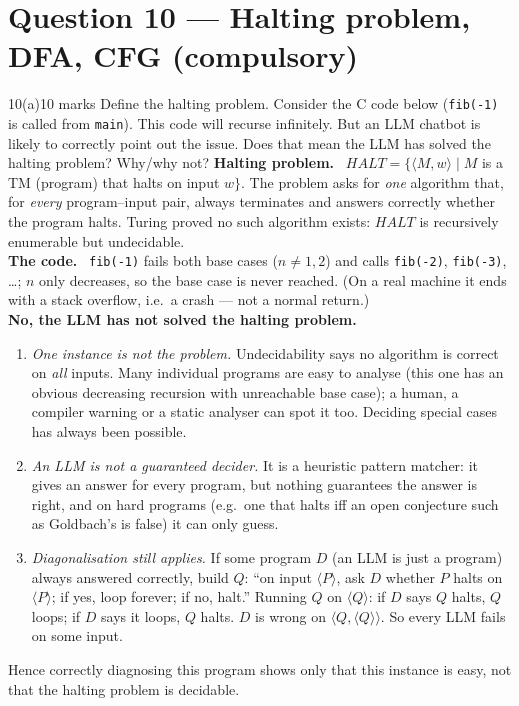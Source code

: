 \documentclass[10.5pt,a4paper]{article}
\newcommand{\ansh}[1]{\textbf{\color{exborder}#1}\ }
\begin{document}
\section{Question 10 --- Halting problem, DFA, CFG (compulsory)}
\begin{qa}{10(a)}{10 marks}
Define the halting problem. Consider the C code below (\texttt{fib(-1)} is called from \texttt{main}). This code will recurse infinitely. But an
LLM chatbot is likely to correctly point out the issue. Does that mean the LLM has solved the halting problem? Why/why not?
\tcblower
\ansh{Halting problem.} $HALT=\{\langle M,w\rangle\mid M$ is a TM (program) that halts on input $w\}$. The problem asks for \emph{one} algorithm that,
for \emph{every} program--input pair, always terminates and answers correctly whether the program halts. Turing proved no such algorithm exists:
$HALT$ is recursively enumerable but undecidable.\\
\ansh{The code.} \texttt{fib(-1)} fails both base cases ($n\ne1,2$) and calls \texttt{fib(-2)}, \texttt{fib(-3)}, \dots; $n$ only decreases, so the
base case is never reached. (On a real machine it ends with a stack overflow, i.e.\ a crash --- not a normal return.)\\
\ansh{No, the LLM has not solved the halting problem.}
\begin{enumerate}
\item \emph{One instance is not the problem.} Undecidability says no algorithm is correct on \emph{all} inputs. Many individual programs are easy
to analyse (this one has an obvious decreasing recursion with unreachable base case); a human, a compiler warning or a static analyser can spot it
too. Deciding special cases has always been possible.
\item \emph{An LLM is not a guaranteed decider.} It is a heuristic pattern matcher: it gives an answer for every program, but nothing guarantees the
answer is right, and on hard programs (e.g.\ one that halts iff an open conjecture such as Goldbach's is false) it can only guess.
\item \emph{Diagonalisation still applies.} If some program $D$ (an LLM is just a program) always answered correctly, build $Q$: ``on input
$\langle P\rangle$, ask $D$ whether $P$ halts on $\langle P\rangle$; if yes, loop forever; if no, halt.'' Running $Q$ on $\langle Q\rangle$: if $D$
says $Q$ halts, $Q$ loops; if $D$ says it loops, $Q$ halts. $D$ is wrong on $\langle Q,\langle Q\rangle\rangle$. So every LLM fails on some input.
\end{enumerate}
Hence correctly diagnosing this program shows only that this instance is easy, not that the halting problem is decidable.
\end{qa}
\end{document}

